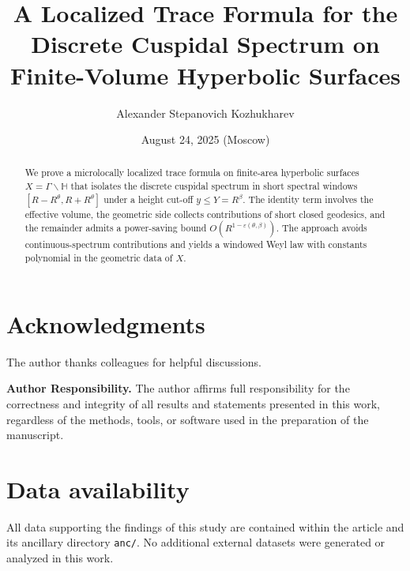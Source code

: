 \documentclass[12pt]{amsart}
\title[Localized Trace Formula]{A Localized Trace Formula for the Discrete Cuspidal Spectrum on Finite-Volume Hyperbolic Surfaces}
\author{Alexander Stepanovich Kozhukharev}
\date{August 24, 2025 (Moscow)}
\numberwithin{equation}{section}
\theoremstyle{plain}
\theoremstyle{definition}
\theoremstyle{remark}
\newcommand{\HH}{\mathbb{H}}
\begin{document}
\begin{abstract}
We prove a microlocally localized trace formula on finite-area hyperbolic surfaces $X=\Gamma\backslash\HH$ that isolates the discrete cuspidal spectrum in short spectral windows $[R-R^\theta,R+R^\theta]$ under a height cut-off $y\le Y=R^\beta$. The identity term involves the effective volume, the geometric side collects contributions of short closed geodesics, and the remainder admits a power-saving bound $O(R^{1-\varepsilon(\theta,\beta)})$. The approach avoids continuous-spectrum contributions and yields a windowed Weyl law with constants polynomial in the geometric data of $X$.
\end{abstract}

\maketitle
\tableofcontents










\section*{Acknowledgments}
The author thanks colleagues for helpful discussions.

\bigskip

\noindent\textbf{Author Responsibility.}
The author affirms full responsibility for the correctness and integrity of all results and statements presented in this work, regardless of the methods, tools, or software used in the preparation of the manuscript.

\section*{Data availability}
All data supporting the findings of this study are contained within the article and its ancillary directory \texttt{anc/}. No additional external datasets were generated or analyzed in this work.

\appendix



\nocite{*}


\end{document}
